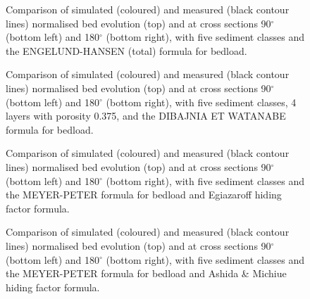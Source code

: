 \begin{figure} [!h]
\centering
{}
\caption{Comparison of simulated (coloured) and measured (black contour lines) normalised bed evolution (top) and  at cross sections 90$^{\circ}$ (bottom left) and 180$^{\circ}$ (bottom right),
with five sediment classes and the ENGELUND-HANSEN (total) formula for bedload.}\label{fig:results_multi30}
\end{figure}
\begin{figure} [!h]
\centering
{}
\caption{Comparison of simulated (coloured) and measured (black contour lines) normalised bed evolution (top) and  at cross sections 90$^{\circ}$ (bottom left) and 180$^{\circ}$ (bottom right),
with five sediment classes, 4 layers with porosity 0.375, and the DIBAJNIA ET WATANABE formula for bedload.}\label{fig:results_multi9}
\end{figure}
\begin{figure} [!h]
\centering
{}
\caption{Comparison of simulated (coloured) and measured (black contour lines) normalised bed evolution (top) and  at cross sections 90$^{\circ}$ (bottom left) and 180$^{\circ}$ (bottom right),
with five sediment classes and the MEYER-PETER formula for bedload and Egiazaroff hiding factor formula.}\label{fig:results_multi1_hid1}
\end{figure}
\begin{figure} [!h]
\centering
{}
\caption{Comparison of simulated (coloured) and measured (black contour lines) normalised bed evolution (top) and  at cross sections 90$^{\circ}$ (bottom left) and 180$^{\circ}$ (bottom right),
with five sediment classes and the MEYER-PETER formula for bedload and Ashida \& Michiue hiding factor formula.}\label{fig:results_multi1_hid2}
\end{figure}
